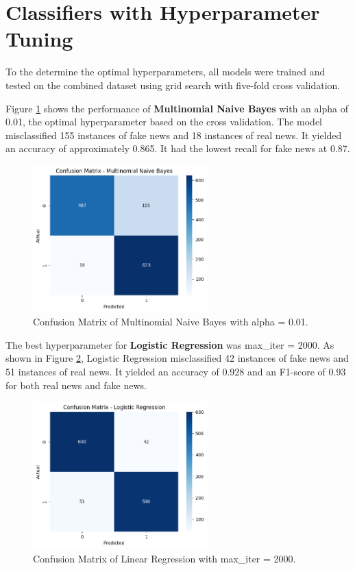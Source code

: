 \section{Classifiers with Hyperparameter Tuning}
\label{sec:ParamTuning}
To the determine the optimal hyperparameters, all models were trained and tested on the combined dataset using grid search with five-fold cross validation.

Figure \ref{MNB_hyperparam} shows the performance of \textbf{Multinomial Naive Bayes} with an alpha of 0.01, the optimal hyperparameter based on the cross validation. The model misclassified 155 instances of fake news and 18 instances of real news. It yielded an accuracy of approximately 0.865. It had the lowest recall for fake news at 0.87.

\begin{figure}[h!]
\centering
\includegraphics[width=0.6\textwidth,height=0.6\textheight, keepaspectratio]{figures/hyperparam/MNB.png}
    \caption{Confusion Matrix of Multinomial Naive Bayes with alpha = 0.01.}
    \label{MNB_hyperparam}
\end{figure}

The best hyperparameter for \textbf{Logistic Regression} was max\_iter = 2000. As shown in Figure \ref{LR_hyperparam}, Logistic Regression misclassified 42 instances of fake news and 51 instances of real news. It yielded an accuracy of 0.928 and an F1-score of 0.93 for both real news and fake news.

\begin{figure}[h!]
\centering
\includegraphics[width=0.6\textwidth,height=0.6\textheight, keepaspectratio]{figures/hyperparam/LR.png}
    \caption{Confusion Matrix of Linear Regression with max\_iter = 2000.}
    \label{LR_hyperparam}
\end{figure}

